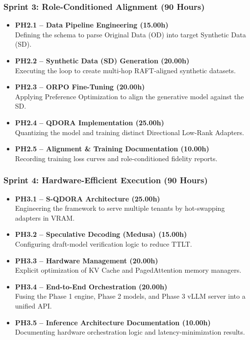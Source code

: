 \subsubsection*{Sprint 3: Role-Conditioned Alignment (90 Hours)}
\begin{itemize}[leftmargin=*, itemsep=4pt]
    \item \textbf{PH2.1 -- Data Pipeline Engineering (15.00h)} \\
    Defining the schema to parse Original Data (OD) into target Synthetic Data (SD).
    \item \textbf{PH2.2 -- Synthetic Data (SD) Generation (20.00h)} \\
    Executing the loop to create multi-hop RAFT-aligned synthetic datasets.
    \item \textbf{PH2.3 -- ORPO Fine-Tuning (20.00h)} \\
    Applying Preference Optimization to align the generative model against the SD.
    \item \textbf{PH2.4 -- QDORA Implementation (25.00h)} \\
    Quantizing the model and training distinct Directional Low-Rank Adapters.
    \item \textbf{PH2.5 -- Alignment \& Training Documentation (10.00h)} \\
    Recording training loss curves and role-conditioned fidelity reports.
\end{itemize}

\subsubsection*{Sprint 4: Hardware-Efficient Execution (90 Hours)}
\begin{itemize}[leftmargin=*, itemsep=4pt]
    \item \textbf{PH3.1 -- S-QDORA Architecture (25.00h)} \\
    Engineering the framework to serve multiple tenants by hot-swapping adapters in VRAM.
    \item \textbf{PH3.2 -- Speculative Decoding (Medusa) (15.00h)} \\
    Configuring draft-model verification logic to reduce TTLT.
    \item \textbf{PH3.3 -- Hardware Management (20.00h)} \\
    Explicit optimization of KV Cache and PagedAttention memory managers.
    \item \textbf{PH3.4 -- End-to-End Orchestration (20.00h)} \\
    Fusing the Phase 1 engine, Phase 2 models, and Phase 3 vLLM server into a unified API.
    \item \textbf{PH3.5 -- Inference Architecture Documentation (10.00h)} \\
    Documenting hardware orchestration logic and latency-minimization results.
\end{itemize}

